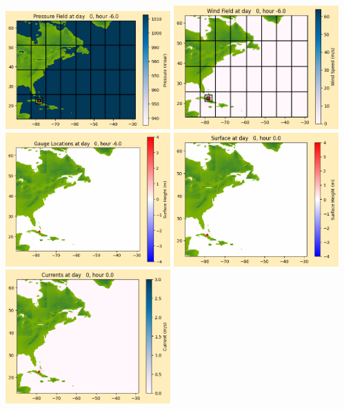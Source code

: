 \documentclass[11pt]{article}
\begin{document}
\includegraphics[width=0.475\textwidth]{frame0011fig1012.png}
\vskip 10pt 
\includegraphics[width=0.475\textwidth]{frame0011fig1013.png}
\includegraphics[width=0.475\textwidth]{frame0011fig1014.png}
\vskip 10pt 
\includegraphics[width=0.475\textwidth]{frame0012fig1001.png}
\includegraphics[width=0.475\textwidth]{frame0012fig1002.png}
\end{document}
